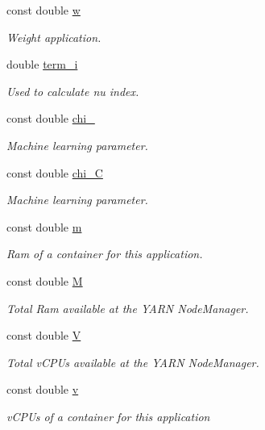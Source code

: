 \begin{DoxyCompactItemize}
const double \hyperlink{classApplication_a89e171cf287b09ce4b37dd94c0d61e2b}{w}
\begin{DoxyCompactList}\small\item\em Weight application. \end{DoxyCompactList}\item 
double \hyperlink{classApplication_ad5486702327ad61e56ed04fb54d58c20}{term\-\_\-i}
\begin{DoxyCompactList}\small\item\em Used to calculate nu index. \end{DoxyCompactList}\item 
const double \hyperlink{classApplication_a6066fad4c229a6035652efd712d0d78c}{chi\-\_}
\begin{DoxyCompactList}\small\item\em Machine learning parameter. \end{DoxyCompactList}\item 
const double \hyperlink{classApplication_a73d8a1604a2b2c99b14db1c8bd9c2798}{chi\-\_\-\-C}
\begin{DoxyCompactList}\small\item\em Machine learning parameter. \end{DoxyCompactList}\item 
const double \hyperlink{classApplication_ad95ca8809237917d16779d7ed0013c8e}{m}
\begin{DoxyCompactList}\small\item\em Ram of a container for this application. \end{DoxyCompactList}\item 
const double \hyperlink{classApplication_a98cc47f6aa4ac3c70133d2922952ef7a}{M}
\begin{DoxyCompactList}\small\item\em Total Ram available at the Y\-A\-R\-N Node\-Manager. \end{DoxyCompactList}\item 
const double \hyperlink{classApplication_a03a99fa3553c376653e53bb5f489c316}{V}
\begin{DoxyCompactList}\small\item\em Total v\-C\-P\-Us available at the Y\-A\-R\-N Node\-Manager. \end{DoxyCompactList}\item 
const double \hyperlink{classApplication_a57853498c230af817bc4173169847bfc}{v}
\begin{DoxyCompactList}\small\item\em v\-C\-P\-Us of a container for this application \end{DoxyCompactList}\item 

\end{DoxyCompactItemize}
